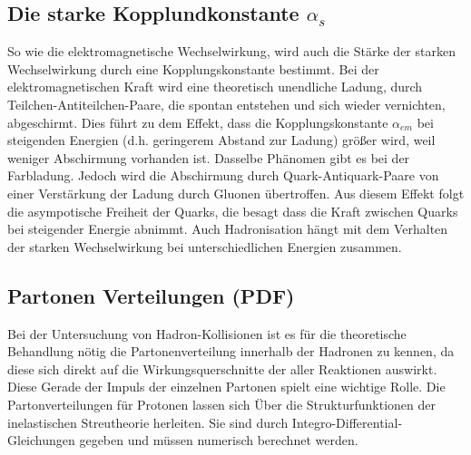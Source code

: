\subsection{Die starke Kopplundkonstante $\alpha_s$}\label{sec:alpha}
So wie die elektromagnetische Wechselwirkung, wird auch die Stärke der starken Wechselwirkung durch eine Kopplungskonstante bestimmt. Bei der elektromagnetischen Kraft wird eine theoretisch unendliche Ladung, durch Teilchen-Antiteilchen-Paare, die spontan entstehen und sich wieder vernichten, abgeschirmt. Dies führt zu dem Effekt, dass die Kopplungskonstante $\alpha_{em}$ bei steigenden Energien (d.h. geringerem Abstand zur Ladung) größer wird, weil weniger Abschirmung vorhanden ist. Dasselbe Phänomen gibt es bei der Farbladung. Jedoch wird die Abschirmung durch Quark-Antiquark-Paare von einer Verstärkung der Ladung durch Gluonen übertroffen. Aus diesem Effekt folgt die asympotische Freiheit der Quarks, die besagt dass die Kraft zwischen Quarks bei steigender Energie abnimmt. Auch Hadronisation hängt mit dem Verhalten der starken Wechselwirkung bei unterschiedlichen Energien zusammen.

\subsection{Partonen Verteilungen (PDF)}
Bei der Untersuchung von Hadron-Kollisionen ist es für die theoretische Behandlung nötig die Partonenverteilung innerhalb der Hadronen zu kennen, da diese sich direkt auf die Wirkungsquerschnitte der aller Reaktionen auswirkt. Diese Gerade der Impuls der einzelnen Partonen spielt eine wichtige Rolle. Die Partonverteilungen für Protonen lassen sich Über die Strukturfunktionen der inelastischen Streutheorie herleiten. Sie sind durch Integro-Differential-Gleichungen gegeben und müssen numerisch berechnet werden. 


